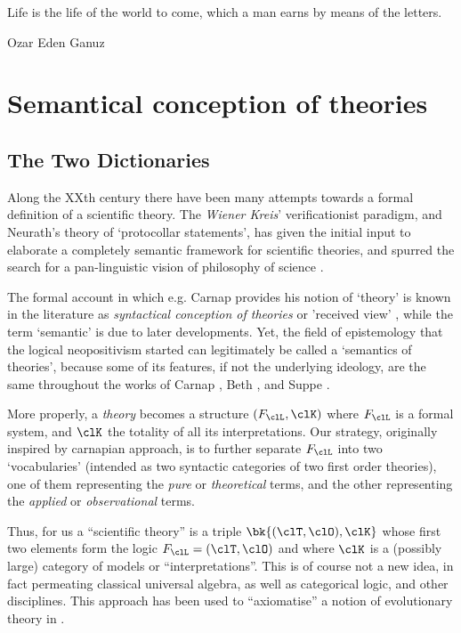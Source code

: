\epigraph{Life is the life of the world to come, which a man earns by means of the letters.}{Ozar Eden Ganuz}
\section{Semantical conception of theories}
\subsection{The Two Dictionaries}
Along the XXth century there have been many attempts towards a formal definition of a scientific theory. The \emph{Wiener Kreis}' verificationist paradigm, and Neurath's theory of `protocollar statements', has given the initial input to elaborate a completely semantic framework for scientific theories, and spurred the search for a pan-linguistic vision of philosophy of science \cite{Weinb}.

The formal account in which e.g. Carnap \cite{carnapfound} provides his notion of `theory' is known in the literature as \emph{syntactical conception of theories} or 'received view' \cite{krause-foundation,krause2011axiomatization,giunti2016}, while the term `semantic' is due to later developments. Yet, the field of epistemology that the logical neopositivism started can legitimately be called a `semantics of theories', because some of its features, if not the underlying ideology, are the same throughout the works of Carnap \cite{carnap56,carnapfound},  Beth \cite{?}, and Suppe \cite{suppe89}.

More properly, a \emph{theory} becomes a structure $(F_\clL, \clK)$ where $F_\clL$ is a formal system, and $\clK$ the totality of all its interpretations. Our strategy, originally inspired by carnapian approach, is to further separate $F_\clL$ into two `vocabularies' (intended as two syntactic categories of two first order theories), one of them representing the \emph{pure} or \emph{theoretical} terms, and the other representing the \emph{applied} or \emph{observational} terms. 

Thus, for us a ``scientific theory'' is a triple $\bk{(\clT,\clO), \clK}$ whose first two elements form the logic $F_\clL=(\clT,\clO)$ and where $\clK$ is a (possibly large) category of models or ``interpretations''. This is of course not a new idea, in fact permeating classical universal algebra, as well as categorical logic, and other disciplines. This approach has been used to ``axiomatise'' a notion of evolutionary theory in \cite{biologia}.

